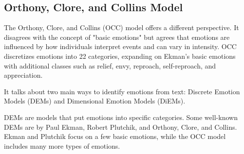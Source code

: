 \documentclass[11pt]{article}
\begin{document}
\begin{multicols*}{2}
    \subsection*{Orthony, Clore, and Collins Model}
    \par The Orthony, Clore, and Collins (OCC) model offers a different perspective. It disagrees with the concept of "basic emotions" but agrees that emotions are influenced by how individuals interpret events and can vary in intensity. OCC discretizes emotions into 22 categories, expanding on Ekman's basic emotions with additional classes such as relief, envy, reproach, self-reproach, and appreciation.\cite{ortony2022cognitive}
    \\
    \par It talks about two main ways to identify emotions from text: Discrete Emotion Models (DEMs) and Dimensional Emotion Models (DiEMs).

    DEMs are models that put emotions into specific categories. Some well-known DEMs are by Paul Ekman, Robert Plutchik, and Orthony, Clore, and Collins. Ekman and Plutchik focus on a few basic emotions, while the OCC model includes many more types of emotions.

\end{multicols*}
\end{document}
